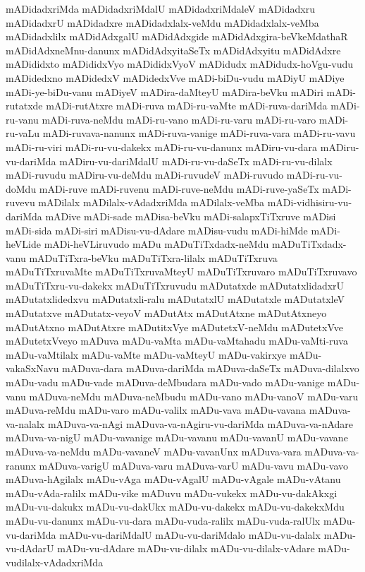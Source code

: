 {mADidadxriMda
mADidadxriMdalU
mADidadxriMdaleV
mADidadxru
mADidadxrU
mADidadxre
mADidadxlalx-veMdu
mADidadxlalx-veMba
mADidadxlilx
mADidAdxgalU
mADidAdxgide
mADidAdxgira-beVkeMdathaR
mADidAdxneMnu-danunx
mADidAdxyitaSeTx
mADidAdxyitu
mADidAdxre
mADididxto
mADididxVyo
mADididxVyoV
mADidudx
mADidudx-hoVgu-vudu
mADidedxno
mADidedxV
mADidedxVve
mADi-biDu-vudu
mADiyU
mADiye
mADi-ye-biDu-vanu
mADiyeV
mADira-daMteyU
mADira-beVku
mADiri
mADi-rutatxde
mADi-rutAtxre
mADi-ruva
mADi-ru-vaMte
mADi-ruva-dariMda
mADi-ru-vanu
mADi-ruva-neMdu
mADi-ru-vano
mADi-ru-varu
mADi-ru-varo
mADi-ru-vaLu
mADi-ruvava-nanunx
mADi-ruva-vanige
mADi-ruva-vara
mADi-ru-vavu
mADi-ru-viri
mADi-ru-vu-dakekx
mADi-ru-vu-danunx
mADiru-vu-dara
mADiru-vu-dariMda
mADiru-vu-dariMdalU
mADi-ru-vu-daSeTx
mADi-ru-vu-dilalx
mADi-ruvudu
mADiru-vu-deMdu
mADi-ruvudeV
mADi-ruvudo
mADi-ru-vu-doMdu
mADi-ruve
mADi-ruvenu
mADi-ruve-neMdu
mADi-ruve-yaSeTx
mADi-ruvevu
mADilalx
mADilalx-vAdadxriMda
mADilalx-veMba
mADi-vidhisiru-vu-dariMda
mADive
mADi-sade
mADisa-beVku
mADi-salapxTiTxruve
mADisi
mADi-sida
mADi-siri
mADisu-vu-dAdare
mADisu-vudu
mADi-hiMde
mADi-heVLide
mADi-heVLiruvudo
mADu
mADuTiTxdadx-neMdu
mADuTiTxdadx-vanu
mADuTiTxra-beVku
mADuTiTxra-lilalx
mADuTiTxruva
mADuTiTxruvaMte
mADuTiTxruvaMteyU
mADuTiTxruvaro
mADuTiTxruvavo
mADuTiTxru-vu-dakekx
mADuTiTxruvudu
mADutatxde
mADutatxlidadxrU
mADutatxlidedxvu
mADutatxli-ralu
mADutatxlU
mADutatxle
mADutatxleV
mADutatxve
mADutatx-veyoV
mADutAtx
mADutAtxne
mADutAtxneyo
mADutAtxno
mADutAtxre
mADutitxVye
mADutetxV-neMdu
mADutetxVve
mADutetxVveyo
mADuva
mADu-vaMta
mADu-vaMtahadu
mADu-vaMti-ruva
mADu-vaMtilalx
mADu-vaMte
mADu-vaMteyU
mADu-vakirxye
mADu-vakaSxNavu
mADuva-dara
mADuva-dariMda
mADuva-daSeTx
mADuva-dilalxvo
mADu-vadu
mADu-vade
mADuva-deMbudara
mADu-vado
mADu-vanige
mADu-vanu
mADuva-neMdu
mADuva-neMbudu
mADu-vano
mADu-vanoV
mADu-varu
mADuva-reMdu
mADu-varo
mADu-valilx
mADu-vava
mADu-vavana
mADuva-va-nalalx
mADuva-va-nAgi
mADuva-va-nAgiru-vu-dariMda
mADuva-va-nAdare
mADuva-va-nigU
mADu-vavanige
mADu-vavanu
mADu-vavanU
mADu-vavane
mADuva-va-neMdu
mADu-vavaneV
mADu-vavanUnx
mADuva-vara
mADuva-va-ranunx
mADuva-varigU
mADuva-varu
mADuva-varU
mADu-vavu
mADu-vavo
mADuva-hAgilalx
mADu-vAga
mADu-vAgalU
mADu-vAgale
mADu-vAtanu
mADu-vAda-ralilx
mADu-vike
mADuvu
mADu-vukekx
mADu-vu-dakAkxgi
mADu-vu-dakukx
mADu-vu-dakUkx
mADu-vu-dakekx
mADu-vu-dakekxMdu
mADu-vu-danunx
mADu-vu-dara
mADu-vuda-ralilx
mADu-vuda-ralUlx
mADu-vu-dariMda
mADu-vu-dariMdalU
mADu-vu-dariMdalo
mADu-vu-dalalx
mADu-vu-dAdarU
mADu-vu-dAdare
mADu-vu-dilalx
mADu-vu-dilalx-vAdare
mADu-vudilalx-vAdadxriMda
}
